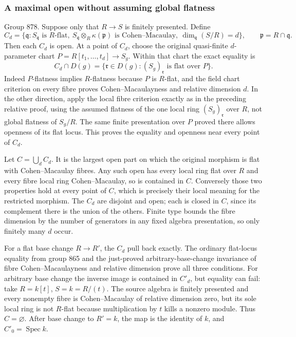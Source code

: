 \subsubsection{A maximal open without assuming global flatness}\label{a-maximal-open-without-assuming-global-flatness}

Group 878. Suppose only that \(R\to S\) is finitely presented. Define \[
C_d=\{\mathfrak q:S_{\mathfrak q}\text{ is }R\text{-flat},
\ S_{\mathfrak q}\otimes_R\kappa(\mathfrak p)\text{ is Cohen–Macaulay},
\ \dim_{\mathfrak q}(S/R)=d\},
\qquad \mathfrak p=R\cap\mathfrak q.
\] Then each \(C_d\) is open. At a point of \(C_d\), choose the original quasi-finite \(d\)-parameter chart \(P=R[t_1,\ldots,t_d]\to S_g\). Within that chart the exact equality is \[
C_d\cap D(g)
=\{\mathfrak r\in D(g):(S_g)_{\mathfrak r}
       \text{ is flat over }P\}.
\] Indeed \(P\)-flatness implies \(R\)-flatness because \(P\) is \(R\)-flat, and the field chart criterion on every fibre proves Cohen--Macaulayness and relative dimension \(d\). In the other direction, apply the local fibre criterion exactly as in the preceding relative proof, using the assumed flatness of the one local ring \((S_g)_{\mathfrak r}\) over \(R\), not global flatness of \(S_g/R\). The same finite presentation over \(P\) proved there allows openness of its flat locus. This proves the equality and openness near every point of \(C_d\).

Let \(C=\bigcup_d C_d\). It is the largest open part on which the original morphism is flat with Cohen--Macaulay fibres. Any such open has every local ring flat over \(R\) and every fibre local ring Cohen--Macaulay, so is contained in \(C\). Conversely those two properties hold at every point of \(C\), which is precisely their local meaning for the restricted morphism. The \(C_d\) are disjoint and open; each is closed in \(C\), since its complement there is the union of the others. Finite type bounds the fibre dimension by the number of generators in any fixed algebra presentation, so only finitely many \(d\) occur.

For a flat base change \(R\to R'\), the \(C_d\) pull back exactly. The ordinary flat-locus equality from group 865 and the just-proved arbitrary-base-change invariance of fibre Cohen--Macaulayness and relative dimension prove all three conditions. For arbitrary base change the inverse image is contained in \(C'_d\), but equality can fail: take \(R=k[t]\), \(S=k=R/(t)\). The source algebra is finitely presented and every nonempty fibre is Cohen--Macaulay of relative dimension zero, but its sole local ring is not \(R\)-flat because multiplication by \(t\) kills a nonzero module. Thus \(C=\varnothing\). After base change to \(R'=k\), the map is the identity of \(k\), and \(C'_0=\operatorname{Spec}k\).

